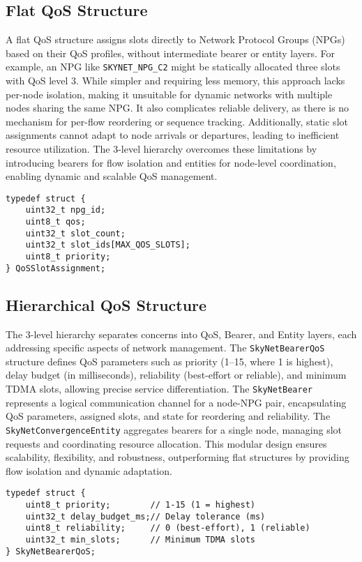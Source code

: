 \documentclass{article}
\begin{document}
\subsection{Flat QoS Structure}
A flat QoS structure assigns slots directly to Network Protocol Groups (NPGs) based on their QoS
profiles, without intermediate bearer or entity layers. For example, an NPG like
\texttt{SKYNET\_NPG\_C2} might be statically allocated three slots with QoS level 3. While simpler
and requiring less memory, this approach lacks per-node isolation, making it unsuitable for dynamic
networks with multiple nodes sharing the same NPG. It also complicates reliable delivery, as there is
no mechanism for per-flow reordering or sequence tracking. Additionally, static slot assignments
cannot adapt to node arrivals or departures, leading to inefficient resource utilization. The 3-level
hierarchy overcomes these limitations by introducing bearers for flow isolation and entities for
node-level coordination, enabling dynamic and scalable QoS management.

\begin{lstlisting}
typedef struct {
    uint32_t npg_id;
    uint8_t qos;
    uint32_t slot_count;
    uint32_t slot_ids[MAX_QOS_SLOTS];
    uint8_t priority;
} QoSSlotAssignment;
\end{lstlisting}

\subsection{Hierarchical QoS Structure}
The 3-level hierarchy separates concerns into QoS, Bearer, and Entity layers, each addressing
specific aspects of network management. The \texttt{SkyNetBearerQoS} structure defines QoS
parameters such as priority (1--15, where 1 is highest), delay budget (in milliseconds), reliability
(best-effort or reliable), and minimum TDMA slots, allowing precise service differentiation. The
\texttt{SkyNetBearer} represents a logical communication channel for a node-NPG pair, encapsulating
QoS parameters, assigned slots, and state for reordering and reliability. The
\texttt{SkyNetConvergenceEntity} aggregates bearers for a single node, managing slot requests and
coordinating resource allocation. This modular design ensures scalability, flexibility, and
robustness, outperforming flat structures by providing flow isolation and dynamic adaptation.

\begin{lstlisting}
typedef struct {
    uint8_t priority;        // 1-15 (1 = highest)
    uint32_t delay_budget_ms;// Delay tolerance (ms)
    uint8_t reliability;     // 0 (best-effort), 1 (reliable)
    uint32_t min_slots;      // Minimum TDMA slots
} SkyNetBearerQoS;
\end{lstlisting}
\end{document}
